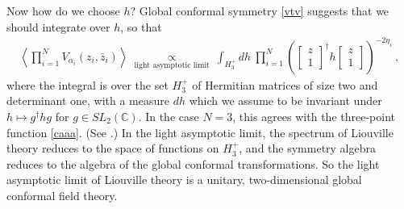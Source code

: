 \documentclass[12pt,a4paper,notitlepage]{report}
\numberwithin{equation}{section}
\theoremstyle{break}
\begin{document}
Now how do we choose $h$? Global conformal symmetry \eqref{vtv} suggests that we should integrate over $h$, so that
\begin{align}
\left\langle\prod_{i=1}^N V_{\alpha_i}(z_i,\bar{z}_i)\right\rangle\ \underset{\text{light\ asymptotic\ limit}}{\propto}\ \int_{H^+_3} dh\ \prod_{i=1}^N \left( \left[\begin{smallmatrix} z \\ 1 \end{smallmatrix}\right]^\dagger h \left[\begin{smallmatrix} z \\ 1 \end{smallmatrix}\right] \right)^{-2\eta_i}\ ,
\label{zih}
\end{align}
where the integral is over the set \textbf{\boldmath $H_3^+$} of Hermitian matrices of size two and determinant one, with a measure $dh$ which we assume to be invariant under $h\mapsto g^\dagger hg$ for $g\in SL_2({\mathbb{C}})$.
In the case $N=3$, this agrees with the three-point function \eqref{caaa}. (See \cite{zz95}.) In the light asymptotic limit, the spectrum of Liouville theory reduces to the space of functions on $H_3^+$, and the symmetry algebra reduces to the algebra of the global conformal transformations.
So
the light asymptotic limit of Liouville theory is a unitary, two-dimensional global conformal field theory.
\end{document}
